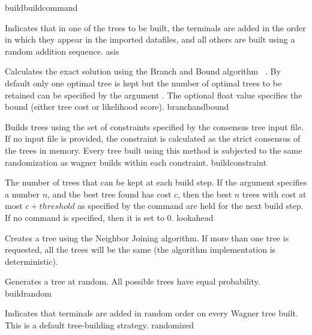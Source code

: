 \begin{command}{build}{buildcommand}
\begin{arguments}
            {Indicates that in one of the trees to be built, the terminals are
            added in the order in which they appear in the imported datafiles,
            and all others are built using a random addition sequence.}
            {asis}

            {Calculates the exact solution using the Branch and Bound algorithm
            ~\cite{hendy1982}. By default only one optimal tree is kept but
            the number of optimal trees to be retained can be specified by the
            argument . The optional float value specifies the
            bound (either tree cost or likelihood score).}
            {branchandbound} 

            {Builds trees using the set of constraints specified by the consensus
            tree input file. If no input file is provided, the constraint is calculated as
            the strict consensus of the trees in memory. Every tree built
            using this method is subjected to the same randomization as wagner
            builds within each constraint.}
            {buildconstraint}

            {The number of trees that can be kept at each build step. If the
             argument 
            specifies a number $n$, and the best tree found has cost $c$, then the best $n$
            trees with cost at most $c + threshold$ as specified by
            the  command are held for the
            next build step. If no  command is specified,
            then it is set to $0$.}
            {lookahead}

            {Creates a tree using the Neighbor Joining algorithm. If more than
            one tree is requested, all the trees will be the same (the algorithm
            implementation is deterministic).}{}

            {Generates a tree at random. All possible trees have equal probability.}
            {buildrandom}

            {Indicates that terminals are added in random order on every Wagner tree built. This is a default tree-building strategy.}
            {randomized}


\end{arguments}
\end{command}
